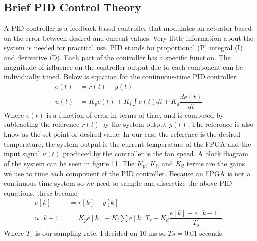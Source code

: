 \documentclass{article}
\begin{document}
\subsection{Brief PID Control Theory}
A PID controller is a feedback based controller that modulates an actuator based on the error between desired and current values. Very little information about the system is needed for practical use. PID stands for proportional (P) integral (I) and derivative (D). Each part of the controller has a specific function. The magnitude of influence on the controller output due to each component can be individually tuned. Below is equation for the continuous-time PID controller
\begin{align*}
e(t) &= r(t)-y(t)\\
u(t) &= K_pe(t)+K_i\int e(t)dt + K_d\dfrac{de(t)}{dt}
\end{align*}
Where $e(t)$ is a function of error in terms of time, and is computed by subtracting the reference $r(t)$ by the system output $y(t)$. The reference is also know as the set point or desired value. In our case the reference is the desired temperature, the system output is the current temperature of the FPGA and the input signal $u(t)$ produced by the controller is the fan speed. A block diagram of the system can be seen in figure 11. The $K_p$, $K_i$, and $K_d$ terms are the gains we use to tune each component of the PID controller. Because an FPGA is not a continuous-time system so we need to sample and discretize the above PID equations, these become
\begin{align*}
e[k] &= r[k]-y[k]\\
u[k+1] &= K_pe[k]+K_i\sum e[k]T_s + K_d\dfrac{e[k]-e[k-1]}{T_s}
\end{align*}
Where $T_s$ is our sampling rate, I decided on 10 ms so $Ts=0.01$ seconds.
\end{document}
